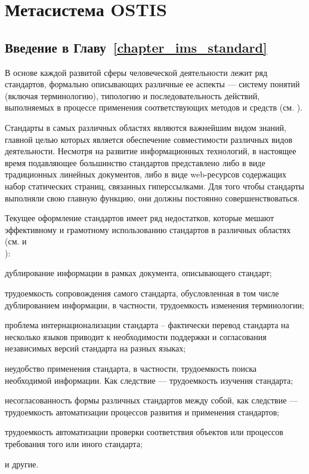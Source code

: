 \chapter{Метасистема OSTIS}
\label{chapter_ims_standard}

\vspace{-7\baselineskip}

\section*{Введение в Главу~\ref{chapter_ims_standard}}

В основе каждой развитой сферы человеческой деятельности лежит ряд стандартов, формально описывающих различные ее аспекты --- систему понятий (включая терминологию), типологию и последовательность действий, выполняемых в процессе применения соответствующих методов и средств (см. ).

Стандарты в самых различных областях являются важнейшим видом знаний, главной целью которых является обеспечение совместимости различных видов деятельности.  Несмотря на развитие информационных технологий, в настоящее время подавляющее большинство стандартов представлено либо в виде традиционных линейных документов, либо в виде web-ресурсов содержащих набор статических страниц, связанных гиперссылками. Для того чтобы стандарты выполняли свою главную функцию, они должны постоянно совершенствоваться. 

Текущее оформление стандартов имеет ряд недостатков, которые мешают эффективному и грамотному использованию стандартов в различных областях (см.  и \\ ):
\begin{textitemize}
	\item дублирование информации в рамках документа, описывающего стандарт;
	\item трудоемкость сопровождения самого стандарта, обусловленная в том числе дублированием информации, в частности, трудоемкость изменения терминологии;
	\item проблема интернационализации стандарта -- фактически перевод стандарта на несколько языков приводит к необходимости поддержки и согласования независимых версий стандарта на разных языках;
	\item неудобство применения стандарта, в частности, трудоемкость поиска необходимой информации. Как следствие --- трудоемкость изучения стандарта;
	\item несогласованность формы различных стандартов между собой, как следствие --- трудоемкость автоматизации процессов развития и применения стандартов;
	\item трудоемкость автоматизации проверки соответствия объектов или процессов требования того или иного стандарта;
	\item  и другие.
\end{textitemize}

